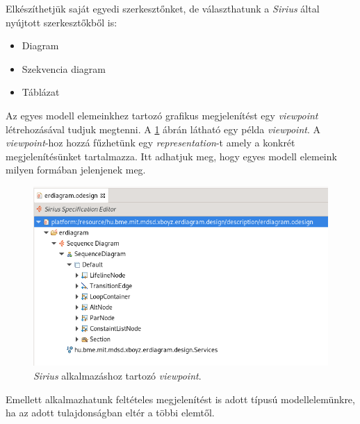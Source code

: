 Elkészíthetjük saját egyedi szerkesztőnket, de választhatunk a \textit{Sirius} által nyújtott szerkesztőkből is:
\begin{itemize}
	\item Diagram
	\item Szekvencia diagram
	\item Táblázat
\end{itemize}

Az egyes modell elemeinkhez tartozó grafikus megjelenítést egy \textit{viewpoint} létrehozásával tudjuk megtenni.
A \ref{sirius_viewpoint} ábrán látható egy példa \textit{viewpoint}.
A \textit{viewpoint}-hoz hozzá fűzhetünk egy \textit{representation}-t amely a konkrét megjelenítésünket tartalmazza.
Itt adhatjuk meg, hogy egyes modell elemeink milyen formában jelenjenek meg.

\begin{figure}[!ht]
    \centering
    \includegraphics[width=150mm, keepaspectratio]{figures/sirius_viewpoint.png}
    \caption{\textit{Sirius} alkalmazáshoz tartozó \textit{viewpoint}.}
    \label{sirius_viewpoint}
\end{figure}

Emellett alkalmazhatunk feltételes megjelenítést is adott típusú modellelemünkre, ha az adott tulajdonságban eltér a többi elemtől.